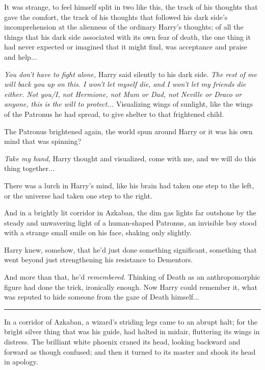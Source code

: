 It was strange, to feel himself split in two like this, the track of his
thoughts that gave the comfort, the track of his thoughts that followed
his dark side's incomprehension at the alienness of the ordinary Harry's
thoughts; of all the things that his dark side associated with its own
fear of death, the one thing it had never expected or imagined that it
might find, was acceptance and praise and help...

\emph{You don't have to fight alone,} Harry said silently to his dark
side. \emph{The rest of me will back you up on this. I won't let myself
die, and I won't let my friends die either. Not you/I, not Hermione, not
Mum or Dad, not Neville or Draco or anyone, this is the will to
protect...} Visualizing wings of sunlight, like the wings of the
Patronus he had spread, to give shelter to that frightened child.

The Patronus brightened again, the world spun around Harry or it was his
own mind that was spinning?

\emph{Take my hand,} Harry thought and visualized, come with me, and we
will do this thing together...

There was a lurch in Harry's mind, like his brain had taken one step to
the left, or the universe had taken one step to the right.

And in a brightly lit corridor in Azkaban, the dim gas lights far
outshone by the steady and unwavering light of a human-shaped Patronus,
an invisible boy stood with a strange small smile on his face, shaking
only slightly.

Harry knew, somehow, that he'd just done something significant,
something that went beyond just strengthening his resistance to
Dementors.

And more than that, he'd \emph{remembered}. Thinking of Death as an
anthropomorphic figure had done the trick, ironically enough. Now Harry
could remember it, what was reputed to hide someone from the gaze of
Death himself...

\begin{center}\rule{3in}{0.4pt}\end{center}

In a corridor of Azkaban, a wizard's striding legs came to an abrupt
halt; for the bright silver thing that was his guide, had halted in
midair, fluttering its wings in distress. The brilliant white phoenix
craned its head, looking backward and forward as though confused; and
then it turned to its master and shook its head in apology.

